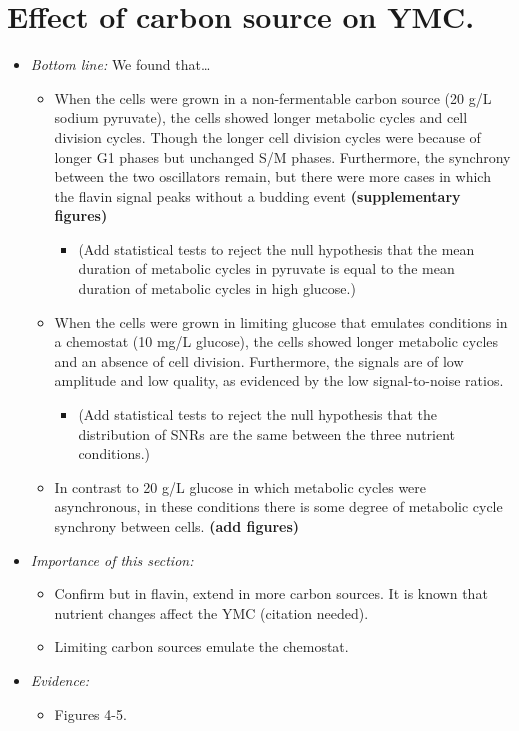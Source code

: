 \section{Effect of carbon source on YMC.}
\label{sec:biology-carbon}

\begin{itemize}
\item \emph{Bottom line:} We found that\ldots{}
\begin{itemize}
\item When the cells were grown in a non-fermentable carbon source (20 g/L sodium pyruvate), the cells showed longer metabolic cycles and cell division cycles.  Though the longer cell division cycles were because of longer G1 phases but unchanged S/M phases.  Furthermore, the synchrony between the two oscillators remain, but there were more cases in which the flavin signal peaks without a budding event \textbf{(supplementary figures)}
\begin{itemize}
\item (Add statistical tests to reject the null hypothesis that the mean duration of metabolic cycles in pyruvate is equal to the mean duration of metabolic cycles in high glucose.)
\end{itemize}
\item When the cells were grown in limiting glucose that emulates conditions in a chemostat (10 mg/L glucose), the cells showed longer metabolic cycles and an absence of cell division.  Furthermore, the signals are of low amplitude and low quality, as evidenced by the low signal-to-noise ratios.
\begin{itemize}
\item (Add statistical tests to reject the null hypothesis that the distribution of SNRs are the same between the three nutrient conditions.)
\end{itemize}
\item In contrast to 20 g/L glucose in which metabolic cycles were asynchronous, in these conditions there is some degree of metabolic cycle synchrony between cells. \textbf{(add figures)}
\end{itemize}
\item \emph{Importance of this section:}
\begin{itemize}
\item Confirm \textcite{papagiannakisAutonomousMetabolicOscillations2017} but in flavin, extend in more carbon sources.  It is known that nutrient changes affect the YMC (citation needed).
\item Limiting carbon sources emulate the chemostat.
\end{itemize}
\item \emph{Evidence:}
\begin{itemize}
\item Figures 4-5.
\end{itemize}


\end{itemize}

